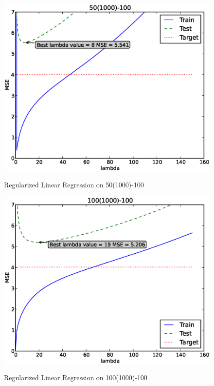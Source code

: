 \documentclass[12pt]{article}
\begin{document}
\begin{figure}[h]
\includegraphics[height=.5\textheight]{1/50(1000)-100.eps}
\label{fig:1-50(1000)-100}
\caption{Regularized Linear Regression on 50(1000)-100}
\end{figure}

\begin{figure}[h]
\includegraphics[height=.5\textheight]{1/100(1000)-100.eps}
\label{fig:1-100(1000)-100}
\caption{Regularized Linear Regression on 100(1000)-100}
\end{figure}
\end{document}
